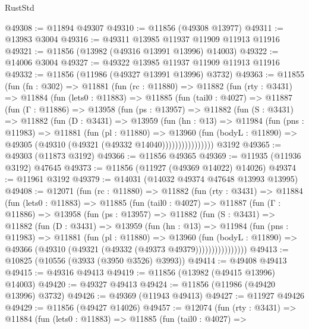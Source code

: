 \begin{lexlean}{RustStd}
\begin{coremodule}
@49308 := @11894 @49307
@49310 := @11856 (@49308 @13977)
@49311 := @13983 @3004
@49316 := @49311 @13985 @11937 @11909 @11913 @11916
@49321 := @11856 (@13982 (@49316 @13991 @13996) @14003)
@49322 := @14006 @3004
@49327 := @49322 @13985 @11937 @11909 @11913 @11916
@49332 := @11856 (@11986 (@49327 @13991 @13996) @3732)
@49363 := @11855
    (fun (fn : @302) =>
    @11881
      (fun (rc : @11880) =>
      @11882
        (fun (rty : @3431) =>
        @11884
          (fun (lets0 : @11883) =>
          @11885
            (fun (tail0 : @4027) =>
            @11887
              (fun (Γ : @11886) =>
              @13958
                (fun (ps : @13957) =>
                @11882
                  (fun (S : @3431) =>
                  @11882
                    (fun (D : @3431) =>
                    @13959
                      (fun (hn : @13) =>
                      @11984
                        (fun (pns : @11983) =>
                        @11881
                          (fun (pl : @11880) =>
                          @13960
                            (fun (bodyL : @11890) =>
                            @49305 (@49310 (@49321 (@49332 @14040))))))))))))))))
    @3192
@49365 := @49303 (@11873 @3192)
@49366 := @11856 @49365
@49369 := @11935 (@11936 @3192) @47645
@49373 := @11856 (@11927 (@49369 @14022) @14026)
@49374 := @11961 @3192
@49379 := @14031 (@14032 @49374 @47648 @13993 @13995)
@49408 := @12071
    (fun (rc : @11880) =>
    @11882
      (fun (rty : @3431) =>
      @11884
        (fun (lets0 : @11883) =>
        @11885
          (fun (tail0 : @4027) =>
          @11887
            (fun (Γ : @11886) =>
            @13958
              (fun (ps : @13957) =>
              @11882
                (fun (S : @3431) =>
                @11882
                  (fun (D : @3431) =>
                  @13959
                    (fun (hn : @13) =>
                    @11984
                      (fun (pns : @11983) =>
                      @11881
                        (fun (pl : @11880) =>
                        @13960
                          (fun (bodyL : @11890) =>
                          @49366 (@49310 (@49321 (@49332 (@49373 @49379))))))))))))))))
@49413 := @10825 (@10556 (@3933 (@3950 @3526) @3993))
@49414 := @49408 @49413
@49415 := @49316 @49413
@49419 := @11856 (@13982 (@49415 @13996) @14003)
@49420 := @49327 @49413
@49424 := @11856 (@11986 (@49420 @13996) @3732)
@49426 := @49369 (@11943 @49413)
@49427 := @11927 @49426
@49429 := @11856 (@49427 @14026)
@49457 := @12074
    (fun (rty : @3431) =>
    @11884
      (fun (lets0 : @11883) =>
      @11885
        (fun (tail0 : @4027) =>

\end{coremodule}
\end{lexlean}

